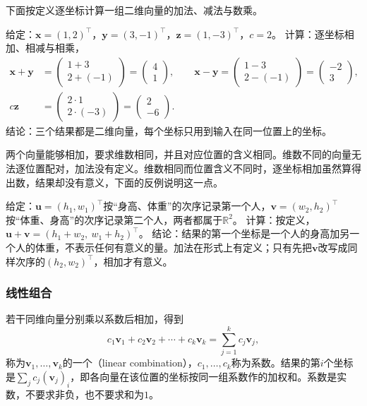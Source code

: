 下面按定义逐坐标计算一组二维向量的加法、减法与数乘。
\begin{example}
\label{ex:ls-vector-addition-scaling}
给定：$\bm x=(1,2)^\top$，$\bm y=(3,-1)^\top$，$\bm z=(1,-3)^\top$，$c=2$。
计算：逐坐标相加、相减与相乘，
\[
 \begin{aligned}
 \bm x+\bm y&=\begin{pmatrix}1+3\\2+(-1)\end{pmatrix}=\begin{pmatrix}4\\1\end{pmatrix},\qquad
 \bm x-\bm y=\begin{pmatrix}1-3\\2-(-1)\end{pmatrix}=\begin{pmatrix}-2\\3\end{pmatrix},\\
 c\bm z&=\begin{pmatrix}2\cdot1\\2\cdot(-3)\end{pmatrix}=\begin{pmatrix}2\\-6\end{pmatrix}.
 \end{aligned}
\]
结论：三个结果都是二维向量，每个坐标只用到输入在同一位置上的坐标。
\end{example}

两个向量能够相加，要求维数相同，并且对应位置的含义相同。维数不同的向量无法逐位置配对，加法没有定义。维数相同而位置含义不同时，逐坐标相加虽然算得出数，结果却没有意义，下面的反例说明这一点。
\begin{example}[反例：维数相同而位置含义不同]
\label{ex:ls-mismatched-positions}
给定：$\bm u=(h_1,w_1)^\top$按“身高、体重”的次序记录第一个人，$\bm v=(w_2,h_2)^\top$按“体重、身高”的次序记录第二个人，两者都属于$\mathbb R^2$。
计算：按定义，$\bm u+\bm v=(h_1+w_2,\ w_1+h_2)^\top$。
结论：结果的第一个坐标是一个人的身高加另一个人的体重，不表示任何有意义的量。加法在形式上有定义；只有先把$\bm v$改写成同样次序的$(h_2,w_2)^\top$，相加才有意义。
\end{example}

\subsubsection{线性组合}

若干同维向量分别乘以系数后相加，得到
\[
 c_1\bm v_1+c_2\bm v_2+\cdots+c_k\bm v_k=\sum_{j=1}^k c_j\bm v_j,
\]
称为$\bm v_1,\ldots,\bm v_k$的一个（linear combination），$c_1,\ldots,c_k$称为系数。结果的第$i$个坐标是$\sum_jc_j(\bm v_j)_i$，即各向量在该位置的坐标按同一组系数作的加权和。系数是实数，不要求非负，也不要求和为$1$。

